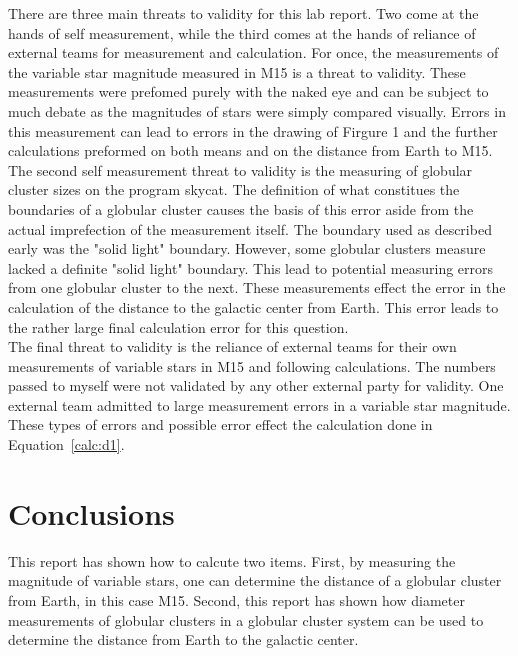\documentclass{article}
\begin{document}
There are three main threats to validity for this lab report. Two come at the hands
of self measurement, while the third comes at the hands of reliance of external
teams for measurement and calculation. For once, the measurements of the variable
star magnitude measured in M15 is a threat to validity. These measurements were prefomed
purely with the naked eye and can be subject to much debate as the magnitudes of
stars were simply compared visually. Errors in this measurement can lead to errors
in the drawing of Firgure 1 and the further calculations preformed on both means and
on the distance from Earth to M15. \\

The second self measurement threat to validity is the measuring of globular cluster
sizes on the program skycat. The definition of what constitues the boundaries of a
globular cluster causes the basis of this error aside from the actual imprefection
of the measurement itself. The boundary used as described early was the "solid light"
boundary. However, some globular clusters measure lacked a definite "solid light"
boundary. This lead to potential measuring errors from one globular cluster to the
next. These measurements effect the error in the calculation of the distance to
the galactic center from Earth. This error leads to the rather large final calculation
error for this question. \\

The final threat to validity is the reliance of external teams for their own measurements
of variable stars in M15 and following calculations. The numbers passed to myself
were not validated by any other external party for validity. One external team
admitted to large measurement errors in a variable star magnitude. These types of errors
and possible error effect the calculation done in Equation~\ref{calc:d1}.




\section{Conclusions}

This report has shown how to calcute two items. First, by measuring the magnitude of
variable stars, one can determine the distance of a globular cluster from Earth,
in this case M15. Second, this report has shown how diameter measurements of globular
clusters in a globular cluster system can be used to determine the distance from
Earth to the galactic center.
\end{document}
